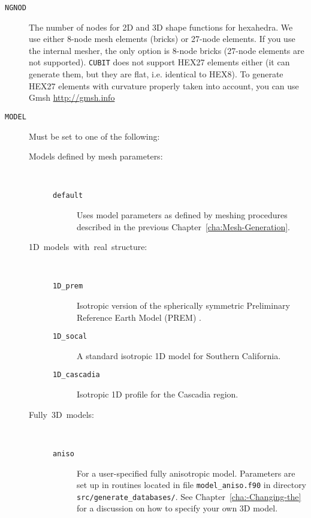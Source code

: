 \vspace{1cm}
\begin{description}
\item [{\texttt{NGNOD}}] The number of nodes for 2D and 3D shape functions
for hexahedra. We use either 8-node mesh elements (bricks) or 27-node
elements. If you use the internal mesher, the only option is 8-node
bricks (27-node elements are not supported). \texttt{CUBIT} does not
support HEX27 elements either (it can generate them, but they are
flat, i.e. identical to HEX8). To generate HEX27 elements with curvature
properly taken into account, you can use Gmsh \url{http://gmsh.info}
\item [{\texttt{MODEL}}] Must be set to one of the following:

\begin{description}
\item [{\textmd{Models defined by mesh parameters:}}] ~

\begin{description}
\item [{\texttt{default}}] Uses model parameters as defined by meshing
procedures described in the previous Chapter~\ref{cha:Mesh-Generation}.
\end{description}

\item [{\textmd{1D~models~with~real~structure:}}] ~

\begin{description}
\item [{\texttt{1D\_prem}}] Isotropic version of the spherically symmetric
Preliminary Reference Earth Model (PREM) \citep{DzAn81}.
\item [{\texttt{1D\_socal}}] A standard isotropic 1D model for Southern
California.
\item [{\texttt{1D\_cascadia}}] Isotropic 1D profile for the Cascadia region.
\end{description}

\item [{\textmd{Fully~3D~models:}}] ~

\begin{description}
\item [{\texttt{aniso}}] For a user-specified fully anisotropic model.
Parameters are set up in routines located in file \texttt{model\_aniso.f90}
in directory \texttt{src/generate\_databases/}. See Chapter~\ref{cha:-Changing-the}
for a discussion on how to specify your own 3D model.


\end{description}
\end{description}
\end{description}
